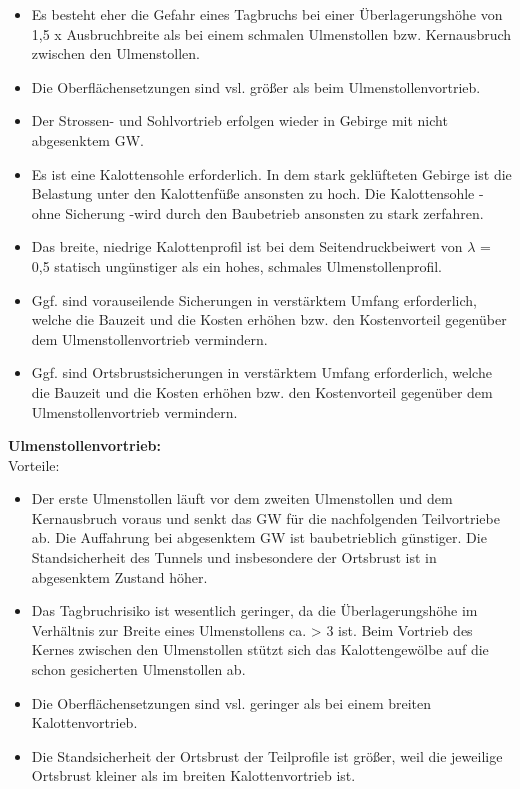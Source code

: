 \documentclass[fleqn,twoside]{article}
\begin{document}
\begin{small}
\begin{itemize}
\begin{itemize}[label={$\blacktriangleright$}]
\begin{itemize}[label={$\blacktriangleright$}]
            \item Es besteht eher die Gefahr eines Tagbruchs bei einer Überlagerungshöhe von 1,5 x Ausbruchbreite als bei einem schmalen Ulmenstollen bzw. Kernausbruch zwischen den Ulmenstollen.
        \item Die Oberflächensetzungen sind vsl. größer als beim Ulmenstollenvortrieb.
        \item Der Strossen- und Sohlvortrieb erfolgen wieder in Gebirge mit nicht abgesenktem GW.
        \item Es ist eine Kalottensohle erforderlich. In dem stark geklüfteten Gebirge ist die Belastung unter den Kalottenfüße ansonsten zu hoch. Die Kalottensohle - ohne Sicherung -wird durch den Baubetrieb ansonsten zu stark zerfahren.
        \item Das breite, niedrige Kalottenprofil ist bei dem Seitendruckbeiwert von $\lambda$ = 0,5 statisch ungünstiger als ein hohes, schmales Ulmenstollenprofil.
        \item Ggf. sind vorauseilende Sicherungen in verstärktem Umfang erforderlich, welche die Bauzeit und die Kosten erhöhen bzw. den Kostenvorteil gegenüber dem Ulmenstollenvortrieb vermindern.
        \item Ggf. sind Ortsbrustsicherungen in verstärktem Umfang erforderlich, welche die Bauzeit und die Kosten erhöhen bzw. den Kostenvorteil gegenüber dem Ulmenstollenvortrieb vermindern.
        \end{itemize}
        \textbf{Ulmenstollenvortrieb:}\\
        Vorteile:
        \begin{itemize}[label={$\blacktriangleright$}]
        \item Der erste Ulmenstollen läuft vor dem zweiten Ulmenstollen und dem Kernausbruch voraus und senkt das GW für die nachfolgenden Teilvortriebe ab. Die Auffahrung bei abgesenktem GW ist baubetrieblich günstiger. Die Standsicherheit des Tunnels und insbesondere der Ortsbrust ist in abgesenktem Zustand höher.
        \item Das Tagbruchrisiko ist wesentlich geringer, da die Überlagerungshöhe im Verhältnis zur Breite eines Ulmenstollens ca. > 3 ist. Beim Vortrieb des Kernes zwischen den Ulmenstollen stützt sich das Kalottengewölbe auf die schon gesicherten Ulmenstollen ab.
        \item Die Oberflächensetzungen sind vsl. geringer als bei einem breiten Kalottenvortrieb.
        \item Die Standsicherheit der Ortsbrust der Teilprofile ist größer, weil die jeweilige Ortsbrust kleiner als im breiten Kalottenvortrieb ist.

\end{itemize}
\end{itemize}
\end{itemize}
\end{small}
\end{document}
